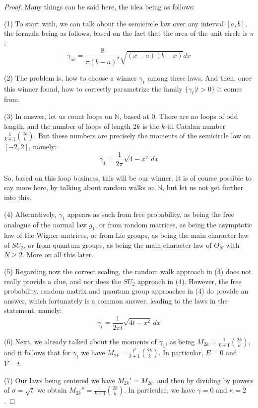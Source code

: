 \documentclass[12pt]{amsbook}
\begin{document}
\begin{proof}
Many things can be said here, the idea being as follows:

\medskip

(1) To start with, we can talk about the semicircle law over any interval $[a,b]$, the formula being as follows, based on the fact that the area of the unit circle is $\pi$:
$$\gamma_{ab}=\frac{8}{\pi(b-a)^2}\sqrt{(x-a)(b-x)}dx$$

(2) The problem is, how to choose a winner $\gamma_1$ among these laws. And then, once this winner found, how to correctly parametrize the family $\{\gamma_t|t>0\}$ it comes from.

\medskip

(3) In answer, let us count loops on $\mathbb N$, based at $0$. There are no loops of odd length, and the number of loops of length $2k$ is the $k$-th Catalan number $\frac{1}{k+1}\binom{2k}{k}$. But these numbers are precisely the moments of the semicircle law on $[-2,2]$, namely:
$$\gamma_1=\frac{1}{2\pi}\sqrt{4-x^2}\,dx$$

So, based on this loop business, this will be our winner. It is of course possible to say more here, by talking about random walks on $\mathbb N$, but let us not get further into this.

\medskip

(4) Alternatively, $\gamma_1$ appears as such from free probability, as being the free analogue of the normal law $g_1$, or from random matrices, as being the asymptotic law of the Wigner matrices, or from Lie groups, as being the main character law of $SU_2$, or from quantum groups, as being the main character law of $O_N^+$ with $N\geq2$. More on all this later.

\medskip

(5) Regarding now the correct scaling, the random walk approach in (3) does not really provide a clue, and nor does the $SU_2$ approach in (4). However, the free probability, random matrix and quantum group approaches in (4) do provide an answer, which fortunately is a common answer, leading to the laws in the statement, namely: 
$$\gamma_t=\frac{1}{2\pi t}\sqrt{4t-x^2}\,dx$$

(6) Next, we already talked about the moments of $\gamma_1$, as being $M_{2k}=\frac{1}{k+1}\binom{2k}{k}$, and it follows that for $\gamma_t$ we have $M_{2k}=\frac{t^k}{k+1}\binom{2k}{k}$. In particular,  $E=0$ and $V=t$.

\medskip

(7) Our laws being centered we have $M_{2k}'=M_{2k}$, and then by dividing by powers of $\sigma=\sqrt{t}$ we obtain $M_{2k}''=\frac{1}{k+1}\binom{2k}{k}$. In particular, we have $\gamma=0$ and $\kappa=2$.


\end{proof}
\end{document}
